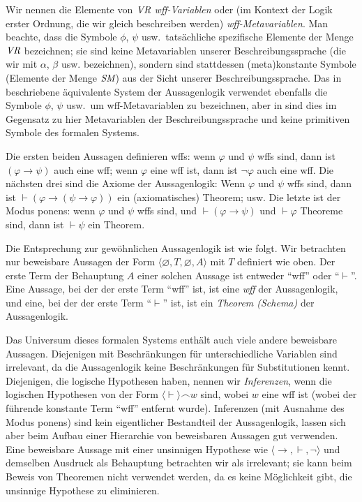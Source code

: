 Wir nennen die Elemente von $\mbox{\em VR}$ {\em wff-Variablen} oder (im Kontext der Logik erster Ordnung, die wir gleich beschreiben werden) {\em wff-Metavariablen}. Man beachte, dass die Symbole $\phi$, $\psi$ usw.\ tatsächliche spezifische Elemente der Menge $\mbox{\em VR}$ bezeichnen; sie sind keine Metavariablen unserer Beschreibungssprache (die wir mit $\alpha$, $\beta$ usw. bezeichnen), sondern sind stattdessen (meta)konstante Symbole (Elemente der Menge $\mbox{\em SM}$) aus der Sicht unserer Beschreibungssprache.  Das in \cite{Tarski1965} beschriebene äquivalente System der Aussagenlogik verwendet ebenfalls die Symbole $\phi$, $\psi$ usw.\, um wff-Metavariablen zu bezeichnen, aber in \cite{Tarski1965} sind dies im Gegensatz zu hier Metavariablen der Beschreibungssprache und keine primitiven Symbole des formalen Systems.

Die ersten beiden Aussagen definieren wffs: wenn $\varphi$ und $\psi$ wffs sind, dann ist $(\varphi \to \psi)$ auch eine wff; wenn $\varphi$ eine wff ist, dann ist $\lnot\varphi$ auch eine wff. Die nächsten drei sind die Axiome der Aussagenlogik: Wenn $\varphi$ und $\psi$ wffs sind, dann ist $\vdash (\varphi \to (\psi \to \varphi))$ ein (axiomatisches) Theorem; usw. Die letzte ist der Modus ponens: wenn $\varphi$ und $\psi$ wffs sind, und $\vdash (\varphi\to\psi)$ und $\vdash \varphi$ Theoreme sind, dann ist $\vdash \psi$ ein Theorem.

Die Entsprechung zur gewöhnlichen Aussagenlogik ist wie folgt.  Wir betrachten nur beweisbare Aussagen der Form $\langle\varnothing, T,\varnothing,A\rangle$ mit $T$ definiert wie oben.  Der erste Term der Behauptung $A$ einer solchen Aussage ist entweder "`wff"' oder "`$\vdash$"'.  Eine Aussage, bei der der erste Term "`wff"' ist, ist eine {\em wff} der Aussagenlogik, und eine, bei der der erste Term "`$\vdash$"' ist, ist ein {\em Theorem (Schema)} der Aussagenlogik.

Das Universum dieses formalen Systems enthält auch viele andere beweisbare Aussagen.  Diejenigen mit Beschränkungen für unterschiedliche Variablen sind irrelevant, da die Aussagenlogik keine Beschränkungen für Substitutionen kennt.  Diejenigen, die logische Hypothesen haben, nennen wir {\em Inferenzen}, wenn die logischen Hypothesen von der Form $\langle\vdash\rangle\frown w$ sind, wobei $w$ eine wff ist (wobei der führende konstante Term "`wff"' entfernt wurde).  Inferenzen (mit Ausnahme des Modus ponens) sind kein eigentlicher Bestandteil der Aussagenlogik, lassen sich aber beim Aufbau einer Hierarchie von beweisbaren Aussagen gut verwenden.  Eine beweisbare Aussage mit einer unsinnigen Hypothese wie $\langle \to,\vdash,\lnot\rangle$ und demselben Ausdruck als Behauptung betrachten wir als irrelevant; sie kann beim Beweis von Theoremen nicht verwendet werden, da es keine Möglichkeit gibt, die unsinnige Hypothese zu eliminieren.

